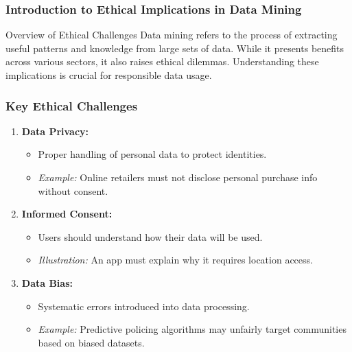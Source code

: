 \documentclass[aspectratio=169]{beamer}
\begin{document}
\frame{\titlepage}

\begin{frame}[fragile]
    \frametitle{Introduction to Ethical Implications in Data Mining}
    \begin{block}{Overview of Ethical Challenges}
        Data mining refers to the process of extracting useful patterns and knowledge from large sets of data. 
        While it presents benefits across various sectors, it also raises ethical dilemmas. 
        Understanding these implications is crucial for responsible data usage.
    \end{block}
\end{frame}

\begin{frame}[fragile]
    \frametitle{Key Ethical Challenges}
    \begin{enumerate}
        \item \textbf{Data Privacy:}
            \begin{itemize}
                \item Proper handling of personal data to protect identities.
                \item \textit{Example:} Online retailers must not disclose personal purchase info without consent.
            \end{itemize}
        
        \item \textbf{Informed Consent:}
            \begin{itemize}
                \item Users should understand how their data will be used.
                \item \textit{Illustration:} An app must explain why it requires location access.
            \end{itemize}
        
        \item \textbf{Data Bias:}
            \begin{itemize}
                \item Systematic errors introduced into data processing.
                \item \textit{Example:} Predictive policing algorithms may unfairly target communities based on biased datasets.
            \end{itemize}
    \end{enumerate}
\end{frame}
\end{document}
